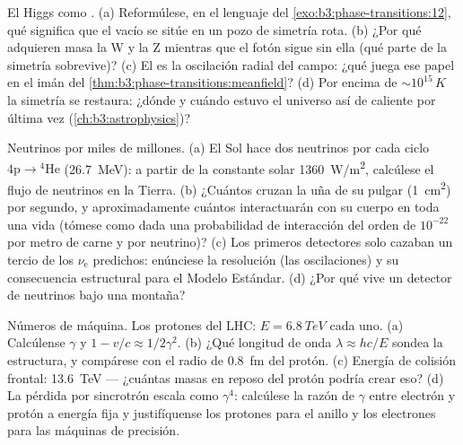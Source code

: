 \begin{exercise}[$\star\star\star$]\label{exo:b3:particle-physics:9}
El Higgs como . (a) Reformúlese, en el lenguaje del
\cref{exo:b3:phase-transitions:12}, qué significa que el
vacío se sitúe en un pozo de simetría rota. (b) ¿Por qué adquieren masa la W y la Z
mientras que el fotón sigue sin ella (qué parte de la
simetría sobrevive)? (c) El  es la oscilación radial del campo:
¿qué juega ese papel en el imán del
\cref{thm:b3:phase-transitions:meanfield}? (d) Por encima de
$\sim10^{15}\,\unit{K}$ la simetría se restaura: ¿dónde y cuándo
estuvo el universo así de caliente por última vez (\cref{ch:b3:astrophysics})?
\end{exercise}

\begin{exercise}[$\star\star\star$]\label{exo:b3:particle-physics:10}
Neutrinos por miles de millones. (a) El Sol hace dos neutrinos por cada
ciclo $4\text{p} \to {}^4\text{He}$ (\qty{26.7}{MeV}): a partir de la
constante solar \qty{1360}{W/m^2}, calcúlese el flujo de neutrinos en la
Tierra. (b) ¿Cuántos cruzan la uña de su pulgar
(\qty{1}{cm^2}) por segundo, y aproximadamente cuántos interactuarán
con su cuerpo en toda una vida (tómese como dada una probabilidad
de interacción del orden de $10^{-22}$ por metro de carne y por neutrino)? (c) Los primeros
detectores solo cazaban un tercio de los
$\nu_{\text{e}}$ predichos: enúnciese la resolución (las oscilaciones) y su
consecuencia estructural para el Modelo Estándar. (d) ¿Por qué vive un
detector de neutrinos bajo una montaña?
\end{exercise}

\begin{exercise}[$\star\star\star$]\label{exo:b3:particle-physics:11}
Números de máquina. Los protones del LHC: $E = \qty{6.8}{TeV}$ cada uno. (a)
Calcúlense $\gamma$ y $1 - v/c \approx 1/2\gamma^2$. (b) ¿Qué
longitud de onda $\lambda \approx hc/E$ sondea la estructura, y compárese
con el radio de \qty{0.8}{fm} del protón. (c) Energía de colisión
frontal: \qty{13.6}{TeV} --- ¿cuántas masas en reposo del protón podría
crear eso? (d) La pérdida por sincrotrón escala como $\gamma^4$:
calcúlese la razón de $\gamma$ entre electrón y protón a energía fija
y justifíquense los protones para el anillo y los electrones para las máquinas
de precisión.
\end{exercise}

